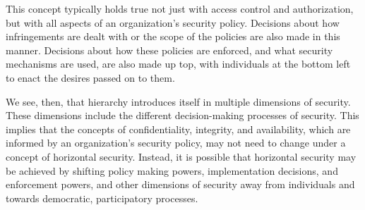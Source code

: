 This concept typically holds true not just with access control and
authorization, but with all aspects of an organization's security policy.
Decisions about how infringements are dealt with or the scope of the policies
are also made in this manner. Decisions about how these policies are enforced,
and what security mechanisms are used, are also made up top, with individuals at
the bottom left to enact the desires passed on to them.

We see, then, that hierarchy introduces itself in multiple dimensions of
security. These dimensions include the different decision-making processes
of security. This implies that the concepts of confidentiality, integrity, and
availability, which are informed by an organization's security policy, may not
need to change under a concept of horizontal security. Instead, it is possible
that horizontal security may be achieved by shifting policy making powers,
implementation decisions, and enforcement powers, and other dimensions of
security away from individuals and towards democratic, participatory processes.

%
%
%

